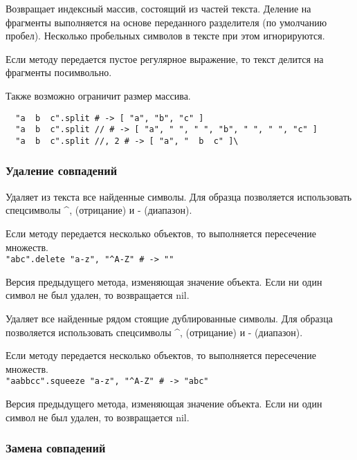 \begin{methodlist}
  Возвращает индексный массив, состоящий из частей текста. Деление на фрагменты выполняется на основе переданного разделителя (по умолчанию пробел). Несколько пробельных символов в тексте при этом игнорируются.

  Если методу передается пустое регулярное выражение, то текст делится на фрагменты посимвольно.

  Также возможно ограничит размер массива.
  \begin{verbatim}
  "a  b  c".split # -> [ "a", "b", "c" ]
  "a  b  c".split // # -> [ "a", " ", " ", "b", " ", " ", "c" ]
  "a  b  c".split //, 2 # -> [ "a", "  b  c" ]\
  \end{verbatim}
\end{methodlist}

\subsubsection*{Удаление совпадений}

\begin{methodlist}
  Удаляет из текста все найденные символы. Для образца позволяется использовать спецсимволы \textasciicircum\-, (отрицание) и - (диапазон).

  Если методу передается несколько объектов, то выполняется пересечение множеств. 
  \\\verb!"abc".delete "a-z", "^A-Z" # -> ""!

  Версия предыдущего метода, изменяющая значение объекта. Если ни один символ не был удален, то возвращается nil.

  Удаляет все найденные рядом стоящие дублированные символы. Для образца позволяется использовать спецсимволы \textasciicircum\-, (отрицание) и - (диапазон).

  Если методу передается несколько объектов, то выполняется пересечение множеств.
  \\\verb!"aabbcc".squeeze "a-z", "^A-Z" # -> "abc"!

  Версия предыдущего метода, изменяющая значение объекта. Если ни один символ не был удален, то возвращается nil.
\end{methodlist}

\subsubsection*{Замена совпадений}

